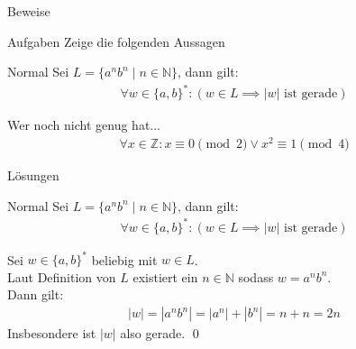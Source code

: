 {
\begin{frame}[fragile]{Beweise}
    \begin{alertblock}{Aufgaben}
        Zeige die folgenden Aussagen
    \end{alertblock}
    \begin{block}{Normal}
        Sei $L = \{a^nb^n \mid n \in \mathbb{N}\}$, dann gilt:
        \begin{align*}
            \forall w \in \{a, b\}^*: \left(w \in L \implies |w| \text{ ist gerade}\right)
        \end{align*}
    \end{block}
    \begin{block}{Wer noch nicht genug hat...}
        \begin{align*}
            \forall x \in \mathbb{Z}: x \equiv 0 \pmod{2} \vee x^2 \equiv 1 \pmod{4}
        \end{align*}
    \end{block}
\end{frame}
}

{
\begin{frame}[fragile]{Lösungen}
    \begin{block}{Normal}
        Sei $L = \{a^nb^n \mid n \in \mathbb{N}\}$, dann gilt:
        \begin{align*}
            \forall w \in \{a, b\}^*: \left(w \in L \implies |w| \text{ ist gerade}\right)
        \end{align*}
    \end{block}
    Sei $w \in \{a,b\}^*$ beliebig mit $w \in L$.\\
    Laut Definition von $L$ existiert ein $n \in \mathbb{N}$ sodass $w = a^nb^n$.\\
    Dann gilt:
    \begin{align*}
        |w| = |a^nb^n| = |a^n| + |b^n| = n+n = 2n 
    \end{align*}
    Insbesondere ist $|w|$ also gerade. \qed
\end{frame}
}

